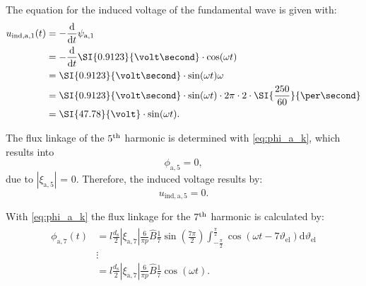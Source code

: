 \begin{solutionblock}
    The equation for the induced voltage of the fundamental wave is given with:
    \begin{align}
        \begin{split}
            u_{\mathrm{ind,a,}1}(t) & = -\frac{\mathrm{d}}{\mathrm{d}t}\psi_{\mathrm{a,}1}                                                       \\
                                    & = -\frac{\mathrm{d}}{\mathrm{d}t} \SI{0.9123}{\volt\second} \cdot \cos(\omega t)                           \\
                                    & = \SI{0.9123}{\volt\second} \cdot \sin(\omega t) \omega                                                    \\
                                    & = \SI{0.9123}{\volt\second} \cdot \sin(\omega t) \cdot 2\pi \cdot 2 \cdot \SI{\frac{250}{60}}{\per\second} \\
                                    & = \SI{47.78}{\volt} \cdot \sin(\omega t).
        \end{split}
    \end{align}

    The flux linkage of the $5\textsuperscript{th}$ harmonic is determined with \eqref{eq:phi_a_k}, which results into
    \begin{equation}
        \phi_{\mathrm{a},5} = 0,
    \end{equation}
    due to $|\xi_{\mathrm{a},5}|$ = 0. Therefore, the induced voltage results by:
    \begin{equation}
        u_{\mathrm{ind,a,}5}  = 0.
    \end{equation}

    With \eqref{eq:phi_a_k} the flux linkage for the $7\textsuperscript{th}$ harmonic is calculated by:
    \begin{align}
        \begin{split}
            \phi_{\mathrm{a,}7}(t) & = l \frac{d_{\mathrm{s}}}{2} |\xi_{\mathrm{a},7}|
            \frac{6}{\pi p} \hat{B}\frac{1}{7} \sin\left(\frac{7\pi}{2}\right) \int_{-\frac{\pi}{2}}^{\frac{\pi}{2}} \cos(\omega t - 7\vartheta_{\mathrm{el}}) \mathrm{d}\vartheta_{\mathrm{el}} \\
                                   & \vdots                                                                                                                                                      \\
                                   & = l \frac{d_{\mathrm{s}}}{2} |\xi_{\mathrm{a},7}|
            \frac{6}{\pi p} \hat{B} \frac{1}{7} \cos(\omega t).
        \end{split}
    \end{align}


\end{solutionblock}
